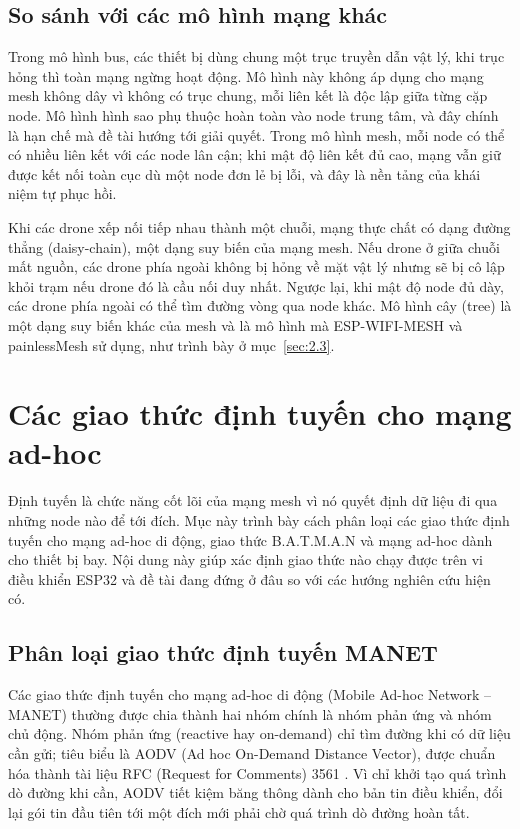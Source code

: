 \subsection{So sánh với các mô hình mạng khác}

Trong mô hình bus, các thiết bị dùng chung một trục truyền dẫn vật lý, khi trục hỏng thì toàn mạng ngừng hoạt động. Mô hình này không áp dụng cho mạng mesh không dây vì không có trục chung, mỗi liên kết là độc lập giữa từng cặp node. Mô hình hình sao phụ thuộc hoàn toàn vào node trung tâm, và đây chính là hạn chế mà đề tài hướng tới giải quyết. Trong mô hình mesh, mỗi node có thể có nhiều liên kết với các node lân cận; khi mật độ liên kết đủ cao, mạng vẫn giữ được kết nối toàn cục dù một node đơn lẻ bị lỗi, và đây là nền tảng của khái niệm tự phục hồi.

Khi các drone xếp nối tiếp nhau thành một chuỗi, mạng thực chất có dạng đường thẳng (daisy-chain), một dạng suy biến của mạng mesh. Nếu drone ở giữa chuỗi mất nguồn, các drone phía ngoài không bị hỏng về mặt vật lý nhưng sẽ bị cô lập khỏi trạm nếu drone đó là cầu nối duy nhất. Ngược lại, khi mật độ node đủ dày, các drone phía ngoài có thể tìm đường vòng qua node khác. Mô hình cây (tree) là một dạng suy biến khác của mesh và là mô hình mà ESP-WIFI-MESH và painlessMesh sử dụng, như trình bày ở mục~\ref{sec:2.3}.


\section{Các giao thức định tuyến cho mạng ad-hoc}

Định tuyến là chức năng cốt lõi của mạng mesh vì nó quyết định dữ liệu đi qua những node nào để tới đích. Mục này trình bày cách phân loại các giao thức định tuyến cho mạng ad-hoc di động, giao thức B.A.T.M.A.N và mạng ad-hoc dành cho thiết bị bay. Nội dung này giúp xác định giao thức nào chạy được trên vi điều khiển ESP32 và đề tài đang đứng ở đâu so với các hướng nghiên cứu hiện có.


\subsection{Phân loại giao thức định tuyến MANET}

Các giao thức định tuyến cho mạng ad-hoc di động (Mobile Ad-hoc Network – MANET) thường được chia thành hai nhóm chính là nhóm phản ứng và nhóm chủ động. Nhóm phản ứng (reactive hay on-demand) chỉ tìm đường khi có dữ liệu cần gửi; tiêu biểu là AODV (Ad hoc On-Demand Distance Vector), được chuẩn hóa thành tài liệu RFC (Request for Comments) 3561 \citep{perkins2003aodv}. Vì chỉ khởi tạo quá trình dò đường khi cần, AODV tiết kiệm băng thông dành cho bản tin điều khiển, đổi lại gói tin đầu tiên tới một đích mới phải chờ quá trình dò đường hoàn tất.

